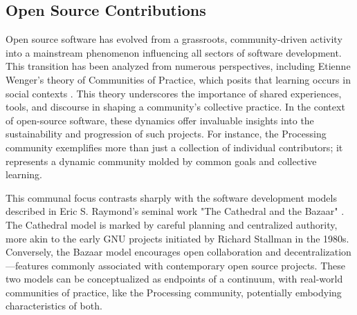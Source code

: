 



\subsection{Open Source Contributions}

Open source software has evolved from a grassroots, community-driven activity into a mainstream phenomenon influencing all sectors of software development. This transition has been analyzed from numerous perspectives, including Etienne Wenger's theory of Communities of Practice, which posits that learning occurs in social contexts \parencite{wengerCommunitiesPracticeLearning1998}. This theory underscores the importance of shared experiences, tools, and discourse in shaping a community's collective practice. In the context of open-source software, these dynamics offer invaluable insights into the sustainability and progression of such projects. For instance, the Processing community exemplifies more than just a collection of individual contributors; it represents a dynamic community molded by common goals and collective learning.

This communal focus contrasts sharply with the software development models described in Eric S. Raymond's seminal work "The Cathedral and the Bazaar" \parencite{CathedralBazaarMusings2002a}. The Cathedral model is marked by careful planning and centralized authority, more akin to the early GNU projects initiated by Richard Stallman in the 1980s. Conversely, the Bazaar model encourages open collaboration and decentralization—features commonly associated with contemporary open source projects. These two models can be conceptualized as endpoints of a continuum, with real-world communities of practice, like the Processing community, potentially embodying characteristics of both.

